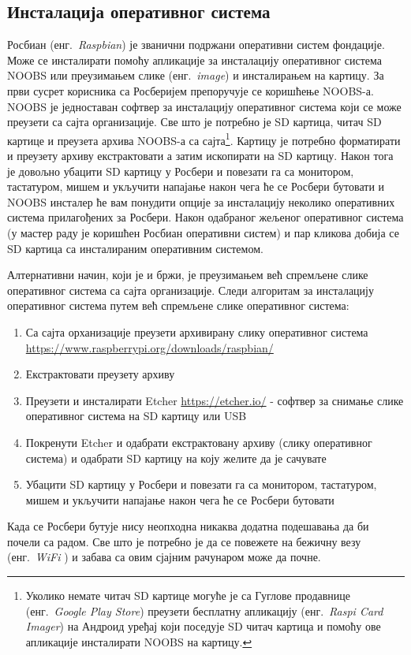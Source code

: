 \documentclass[12pt,oneside]{memoir}
\theoremstyle{remark}
\begin{document}
\subsection{Инсталација оперативног система}
Росбиан  (енг.~{\em Raspbian}) је званични подржани оперативни систем фондације. Може се инсталирати помоћу апликације за инсталацију оперативног система NOOBS или преузимањем слике (енг.~{\em image}) и инсталирањем на картицу. 
За први сусрет корисника са Росберијем препоручује се коришћење NOOBS-а. NOOBS је једноставан софтвер за инсталацију оперативног система који се може преузети са сајта организације. 
Све што је потребно је SD картица, читач SD картице и преузета архива NOOBS-а са сајта\footnote{Уколико немате читач SD картице могуће је са Гуглове продавнице (енг.~{\em Google Play Store}) преузети бесплатну апликацију  (енг.~{\em Raspi Card Imager}) на Андроид уређај који поседује SD читач картица и помоћу ове апликације инсталирати NOOBS на картицу.}. Картицу је потребно форматирати и преузету архиву екстрактовати а затим ископирати на SD картицу. Након тога је довољно убацити SD картицу у Росбери и повезати га са монитором, тастатуром, мишем и укључити напајање након чега ће се Росбери бутовати и NOOBS инсталер ће вам понудити опције за инсталацију неколико оперативних система прилагођених за Росбери. Након одабраног жељеног оперативног система (у мастер раду је коришћен Росбиан оперативни систем) и пар кликова добија се SD картица са инсталираним оперативним системом. 

Алтернативни начин, који је и бржи, је преузимањем већ спремљене слике оперативног система са сајта организације. Следи алгоритам за инсталацију оперативног система путем већ спремљене слике оперативног система:
\begin{enumerate}
\item Са сајта орханизације преузети архивирану слику оперативног система\newline
\url{https://www.raspberrypi.org/downloads/raspbian/} 
\item  Екстрактовати преузету архиву
\item Преузети и инсталирати Etcher \url{https://etcher.io/} - софтвер за снимање слике оперативног система на SD картицу или USB
\item Покренути Etcher и одабрати екстрактовану архиву (слику оперативног система) и одабрати SD картицу на коју желите да је сачувате
\item Убацити SD картицу у Росбери и повезати га са монитором, тастатуром, мишем и укључити напајање након чега ће се Росбери бутовати
\end{enumerate}
Када се Росбери бутује нису неопходна никаква додатна подешавања да би почели са радом. Све што је потребно је да се повежете на бежичну везу (енг.~{\em WiFi }) и забава са овим сјајним рачунаром може да почне.
\end{document}
